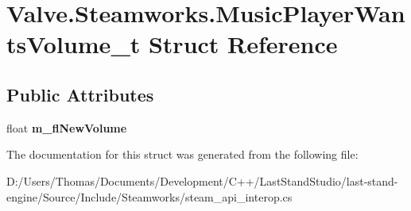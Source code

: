 \hypertarget{structValve_1_1Steamworks_1_1MusicPlayerWantsVolume__t}{}\section{Valve.\+Steamworks.\+Music\+Player\+Wants\+Volume\+\_\+t Struct Reference}
\label{structValve_1_1Steamworks_1_1MusicPlayerWantsVolume__t}
\subsection*{Public Attributes}
\begin{DoxyCompactItemize}
\item 
\hypertarget{structValve_1_1Steamworks_1_1MusicPlayerWantsVolume__t_a7cfa9ff353f017bbaa08c091a43c3d42}{}float {\bfseries m\+\_\+fl\+New\+Volume}\label{structValve_1_1Steamworks_1_1MusicPlayerWantsVolume__t_a7cfa9ff353f017bbaa08c091a43c3d42}

\end{DoxyCompactItemize}


The documentation for this struct was generated from the following file\+:\begin{DoxyCompactItemize}
\item 
D\+:/\+Users/\+Thomas/\+Documents/\+Development/\+C++/\+Last\+Stand\+Studio/last-\/stand-\/engine/\+Source/\+Include/\+Steamworks/steam\+\_\+api\+\_\+interop.\+cs\end{DoxyCompactItemize}
